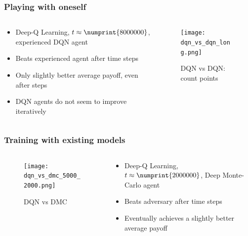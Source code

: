 
\begin{frame}
\frametitle{Playing with oneself}
\begin{columns}[c]

\begin{column}{.5\textwidth}
\begin{itemize}
\item Deep-Q Learning, $t \approx \numprint{8000000}$, experienced DQN agent
\item Beats experienced agent after  time steps
\item Only slightly better average payoff, even after  steps
\item DQN agents do not seem to improve iteratively
\end{itemize}
\end{column}

\begin{column}{.5\textwidth}
\begin{figure}
\texttt{[image: dqn\_vs\_dqn\_long.png]}
\caption{DQN vs DQN: count points}
\end{figure}
\end{column}

\end{columns}
\end{frame}


\begin{frame}
\frametitle{Training with existing models}
\begin{columns}[c]

\begin{column}{.5\textwidth}
\begin{figure}
\texttt{[image: dqn\_vs\_dmc\_5000\_2000.png]}
\caption{DQN vs DMC}
\end{figure}
\end{column}

\begin{column}{.5\textwidth}
\begin{itemize}
\item Deep-Q Learning, $t \approx \numprint{2000000}$, Deep Monte-Carlo agent
\item Beats adversary after  time steps
\item Eventually achieves a slightly better average payoff
\end{itemize}
\end{column}

\end{columns}
\end{frame}

